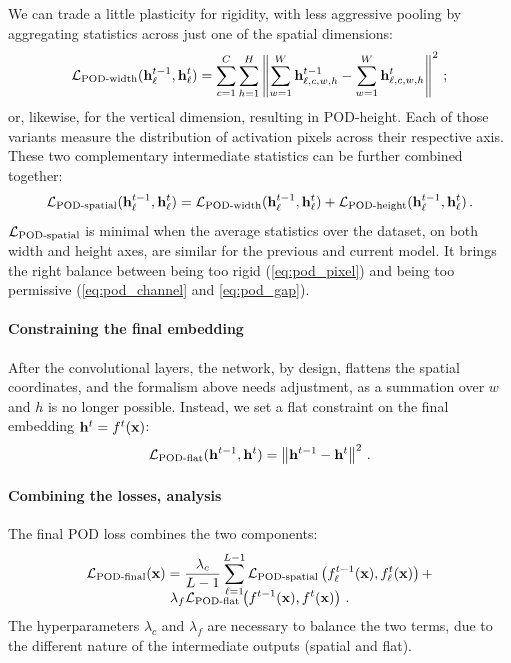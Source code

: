 We can trade a little plasticity for rigidity, with less aggressive pooling by aggregating
statistics across just one of the spatial dimensions:
%
\begin{equation}
    \mathcal{L}_{\text{POD-width}}(\mathbf{h}^{t-1}_\ell, \mathbf{h}^t_\ell)  = \sum_{c=1}^{C} \sum_{h=1}^{H} \left\Vert \sum_{w=1}^W \mathbf{h}^{t-1}_{\ell,c,w,h} - \sum_{w=1}^W \mathbf{h}^{t}_{\ell,c,w,h} \right\Vert^2\label{eq:pod_width}\,;
\end{equation}
%
or, likewise, for the vertical dimension, resulting in POD-height. Each of those variants measure
the distribution of activation pixels across their respective axis. These two complementary
intermediate statistics can be further combined together:
%
\begin{equation}
    \mathcal{L}_{\text{POD-spatial}}(\mathbf{h}^{t-1}_\ell, \mathbf{h}^t_\ell) = \mathcal{L}_{\text{POD-width}}(\mathbf{h}^{t-1}_\ell, \mathbf{h}^t_\ell) + \mathcal{L}_{\text{POD-height}}(\mathbf{h}^{t-1}_\ell, \mathbf{h}^t_\ell)\,.
\end{equation}
%
$\mathcal{L}_{\text{POD-spatial}}$ is minimal when the average statistics over the dataset, on both width
and height axes, are similar for the previous and current model. It brings the right balance between
being too rigid (\autoref{eq:pod_pixel}) and being too permissive (\autoref{eq:pod_channel} and
\ref{eq:pod_gap}).

\label{sec:pod_flat}
\paragraph{Constraining the final embedding} After the convolutional layers, the network, by design,
flattens the spatial coordinates, and the formalism above needs adjustment, as a summation over $w$
and $h$ is no longer possible. Instead, we set a flat constraint on the final embedding $\mathbf{h}^{t} =
    f^{t}(\mathbf{x})$:
%
\begin{equation}
    \mathcal{L}_{\text{POD-flat}}(\mathbf{h}^{t-1}, \mathbf{h}^t) = \left\Vert \mathbf{h}^{t-1} - \mathbf{h}^t \right\Vert^2\label{eq:POD-flat}\,.
\end{equation}

\paragraph{Combining the losses, analysis} The final POD loss combines the two  components:
%
\begin{multline}
    \mathcal{L}_\text{POD-final}(\mathbf{x}) =  \frac{\lambda_{c}}{L-1}\sum_{\ell=1}^{L-1}  \mathcal{L}_{\text{POD-spatial}}\left(f^{t-1}_\ell(\mathbf{x}), f^t_\ell(\mathbf{x})\right) + \\[-0.8em]
    \lambda_{f} \mathcal{L}_\text{POD-flat}\left(f^{t-1}(\mathbf{x}), f^t(\mathbf{x})\right)\,.
\end{multline}
%
The hyperparameters $\lambda_{c}$ and $\lambda_{f}$ are necessary to balance the two terms, due to
the  different nature of the intermediate outputs (spatial and flat).

